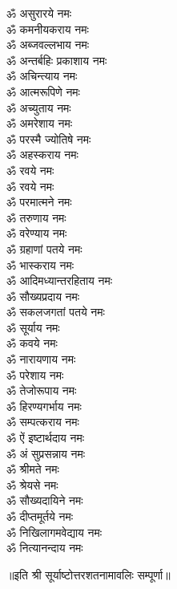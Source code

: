 \begin{multicols}{2}
\begin{flushleft}
        ॐ असुरारये नमः\\
        ॐ कमनीयकराय नमः\\
        ॐ अब्जवल्लभाय नमः\\
        ॐ अन्तर्बहिः प्रकाशाय नमः\\
        ॐ अचिन्त्याय नमः\\
        ॐ आत्मरूपिणे नमः\\
        ॐ अच्युताय नमः\hfill{}\\
        ॐ अमरेशाय नमः\\
        ॐ परस्मै ज्योतिषे नमः\\
        ॐ अहस्कराय नमः\\
        ॐ रवये नमः\\
        ॐ रवये नमः\\
        ॐ परमात्मने नमः\\
        ॐ तरुणाय नमः\\
        ॐ वरेण्याय नमः\\
        ॐ ग्रहाणां पतये नमः\\
        ॐ भास्कराय नमः\hfill{}\\
        ॐ आदिमध्यान्तरहिताय नमः\\
        ॐ सौख्यप्रदाय नमः\\
        ॐ सकलजगतां पतये नमः\\
        ॐ सूर्याय नमः\\
        ॐ कवये नमः\\
        ॐ नारायणाय नमः\\
        ॐ परेशाय नमः\\
        ॐ तेजोरूपाय नमः\\
        ॐ हिरण्यगर्भाय नमः\\
        ॐ सम्पत्कराय नमः\hfill{}\\
        ॐ ऐं इष्टार्थदाय नमः\\
        ॐ अं सुप्रसन्नाय नमः\\
        ॐ श्रीमते नमः\\
        ॐ श्रेयसे नमः\\
        ॐ सौख्यदायिने नमः\\
        ॐ दीप्तमूर्तये नमः\\
        ॐ निखिलागमवेद्याय नमः\\
        ॐ नित्यानन्दाय नमः\hfill{}\\
    \end{flushleft}
\end{multicols}
॥इति श्री सूर्याष्टोत्तरशतनामावलिः सम्पूर्णा॥
